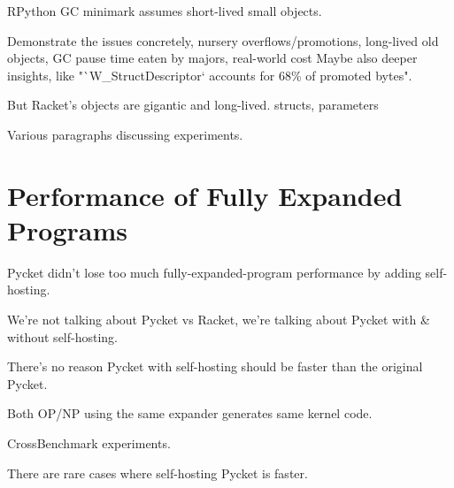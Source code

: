 		\begin{paragraph-here}
			RPython GC minimark assumes short-lived small objects.
		\end{paragraph-here}

		\begin{show-experiment}
				Demonstrate the issues concretely, nursery overflows/promotions, long-lived old objects, GC pause time eaten by majors, real-world cost
				Maybe also deeper insights, like "`W\_StructDescriptor` accounts for 68\% of promoted bytes".
		\end{show-experiment}

		\begin{paragraph-here}
			But Racket's objects are gigantic and long-lived.	structs, parameters
		\end{paragraph-here}

		\begin{paragraph-here}
			Various paragraphs discussing experiments.
		\end{paragraph-here}

	\section{Performance of Fully Expanded Programs}
	\label{section:cross-benchmarks}

		\begin{mainpoint}
				Pycket didn't lose too much fully-expanded-program performance by adding self-hosting.
		\end{mainpoint}

		\begin{paragraph-here}
			We're not talking about Pycket vs Racket, we're talking about Pycket with \& without self-hosting.
		\end{paragraph-here}

		\begin{paragraph-here}
			There’s no reason Pycket with self-hosting should be faster than the original Pycket.

			Both OP/NP using the same expander generates same kernel code.
		\end{paragraph-here}

		\begin{show-experiment}
			CrossBenchmark experiments.
		\end{show-experiment}

		\begin{paragraph-here}
			There are rare cases where self-hosting Pycket is faster.
		\end{paragraph-here}

